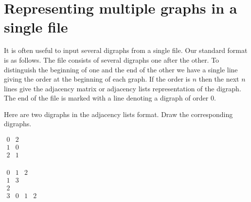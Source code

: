 \section{Representing multiple graphs in a single file}

It is often useful to input several digraphs from a single file. Our
standard format is as follows. The file consists of several digraphs 
one after the other. To distinguish the beginning of one and the end of
the other we have a single line giving the order at the beginning of
each graph. If the order is $n$ then the next $n$ lines give the
adjacency matrix or adjacency lists representation of the digraph. 
The end of the file is marked with a line denoting a digraph of order
$0$.

\begin{Boxample}[1]
Here are two digraphs in the adjacency lists format.  Draw the corresponding digraphs.

\vspace{1cm}
$\begin{array}{c|c}
0 & 2  \\
1 & 0  \\
2 & 1 \\
\end{array}$


\vspace{1.5cm}
$\begin{array}{c|ccc}
0 & 1 & 2  \\
1 & 3  \\
2  \\
3 & 0 & 1 & 2 \\
\end{array}$

\end{Boxample}


